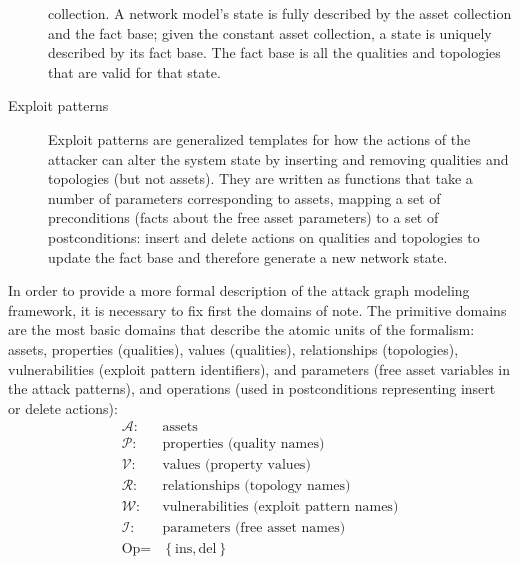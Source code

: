 \begin{description}
		collection. A network model's state is fully described by the asset collection and the fact base;
		given the constant asset collection, a state is uniquely described by its fact base. The fact
		base is all the qualities and topologies that are valid for that state.
	\item[Exploit patterns] Exploit patterns are generalized templates for how the actions of the attacker
		can alter the system state by inserting and removing qualities and topologies (but not assets).
		They are written as functions that take a number of parameters corresponding to assets, mapping
		a set of preconditions (facts about the free asset parameters) to a set of postconditions:
		insert and delete actions on qualities and topologies to update the fact base and therefore
		generate a new network state.
\end{description}
In order to provide a more formal description of the attack graph modeling framework,
it is necessary to fix first the domains of note. The primitive domains are the most basic 
domains that describe the atomic units of
the formalism: assets, properties (qualities), values (qualities), relationships (topologies),
vulnerabilities (exploit pattern identifiers), and parameters (free asset variables in the attack
patterns), and operations (used in postconditions representing insert or delete actions):
\begin{align*}
    \mathcal{A} :& \text{assets} \\
    \mathcal{P} :& \text{properties (quality names)} \\
    \mathcal{V} :& \text{values (property values)} \\
    \mathcal{R} :& \text{relationships (topology names)} \\
    \mathcal{W} :& \text{vulnerabilities (exploit pattern names)} \\
    \mathcal{I} :& \text{parameters (free asset names)} \\
    \text{Op} =& \left\{\text{ins}, \text{del} \right\}
\end{align*}

